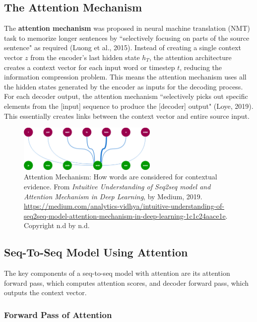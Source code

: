 \subsection{The Attention Mechanism}

The \textbf{attention mechanism} was proposed in neural machine translation (NMT) task to memorize longer sentences by ``selectively focusing on parts of the source sentence" as required (Luong et al., 2015). Instead of creating a single context vector $z$ from the encoder's last hidden state $h_T$, the attention architecture creates a context vector for each input word or timestep $t$, reducing the information compression problem. This means the attention mechanism uses all the hidden states generated by the encoder as inputs for the decoding process. For each decoder output, the attention mechanism ``selectively picks out specific elements from the [input] sequence to produce the [decoder] output" (Loye, 2019). This essentially creates links between the context vector and entire source input. 

\begin{figure}[h]
\centering
\includegraphics[width=0.6\textwidth]{imgs/attention.png}
\caption{\footnotesize Attention Mechanism: How words are considered for contextual evidence. From \emph{Intuitive Understanding of Seq2seq model and Attention Mechanism in Deep Learning}, by Medium, 2019. \url{https://medium.com/analytics-vidhya/intuitive-understanding-of-seq2seq-model-attention-mechanism-in-deep-learning-1c1c24aace1e}. Copyright n.d by n.d.}
\end{figure}

\subsection{Seq-To-Seq Model Using Attention}

The key components of a seq-to-seq model with attention are its attention forward pass, which computes attention scores, and decoder forward pass, which outputs the context vector. 

\subsubsection{Forward Pass of Attention}

